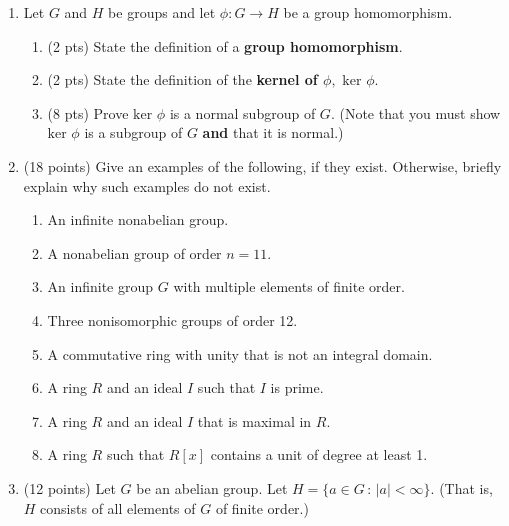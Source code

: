 \documentclass[12pt]{article}
\renewcommand{\emph}[1]{\textsf{\textbf{#1}}}
\begin{document}
\newpage
\begin{enumerate}
\item Let $G$ and $H$ be groups and let $\phi: G \to H$ be a group homomorphism.
	\begin{enumerate}
	\item ({\small 2 pts}) State the definition of a \emph{group homomorphism}.
	\vfill
	\item ({\small 2 pts}) State the definition of the \emph{kernel of $\phi,$} $\text{ker } \phi.$ 
	\vfill
	\item ({\small 8 pts}) Prove $\text{ker }\phi$ is a normal subgroup of $G.$ (Note that you must show $\text{ker }\phi$ is a subgroup of $G$ \emph{and} that it is normal.)
	\vspace{6.5in}
	\end{enumerate}
\newpage
\item ({\small18 points}) Give an examples of the following, if they exist. Otherwise, briefly explain why such examples do not exist.
	\begin{enumerate}
	\item An infinite nonabelian group.\\
	\vfill
	\item A nonabelian group of order $n=11.$\\
	\vfill
	\item An infinite group $G$ with multiple elements of finite order.\\  
	\vfill
	\item Three nonisomorphic groups of order 12.\\
	\vfill
	\item A commutative ring with unity that is not an integral domain.\\
	\vfill
	\item A ring $R$ and an ideal $I$ such that $I$ is prime.\\
	\vfill
	\item A ring $R$ and an ideal $I$ that is maximal in $R$.\\
	\vfill
	\item A ring $R$ such that $R[x]$ contains a unit of degree at least 1.\\
	\vfill
	\end{enumerate}
\newpage
\item ({\small 12 points}) Let $G$ be an abelian group. Let $H=\{ a \in G\, : \, |a| < \infty\}.$ (That is, $H$ consists of all elements of $G$ of finite order.)\\


\end{enumerate}
\end{document}
